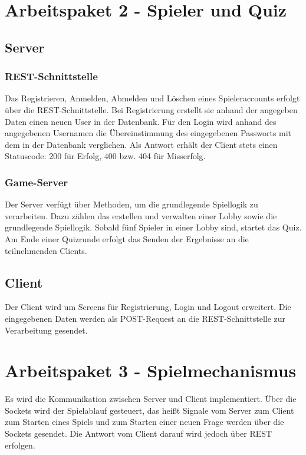 \documentclass[11pt,a4paper]{scrreprt}
\begin{document}
\section{Arbeitspaket 2 - Spieler und Quiz}

\subsection{Server}
\subsubsection{REST-Schnittstelle}
Das Registrieren, Anmelden, Abmelden und Löschen eines Spieleraccounts erfolgt über die REST-Schnittstelle. Bei Registrierung erstellt sie anhand der angegeben Daten einen neuen User in der Datenbank. Für den Login wird anhand des angegebenen Usernamen die Übereinstimmung des eingegebenen Passworts mit dem in der Datenbank verglichen. Als Antwort erhält der Client stets einen Statuscode: 200 für Erfolg, 400 bzw. 404 für Misserfolg.

\subsubsection{Game-Server}
Der Server verfügt über Methoden, um die grundlegende Spiellogik zu verarbeiten. Dazu zählen das erstellen und verwalten einer Lobby sowie die grundlegende Spiellogik. Sobald fünf Spieler in einer Lobby sind, startet das Quiz. Am Ende einer Quizrunde erfolgt das Senden der Ergebnisse an die teilnehmenden Clients.

\subsection{Client}
Der Client wird um Screens für Registrierung, Login und Logout erweitert. Die eingegebenen Daten werden als POST-Request an die REST-Schnittstelle zur Verarbeitung gesendet. 

\section{Arbeitspaket 3 - Spielmechanismus}
Es wird die Kommunikation zwischen Server und Client implementiert. Über die Sockets wird der Spielablauf gesteuert, das heißt Signale vom Server zum Client zum Starten eines Spiels und zum Starten einer neuen Frage werden über die Sockets gesendet. Die Antwort vom Client darauf wird jedoch über REST erfolgen.
\end{document}
